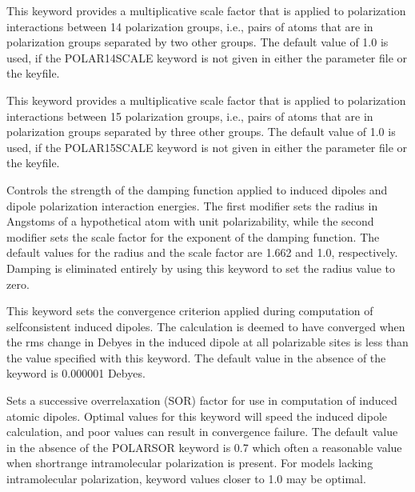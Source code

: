 \documentclass[letterpaper,11pt,english]{sphinxmanual}
\begin{document}
  This keyword provides a multiplicative scale factor that is applied to polarization interactions between 1\sphinxhyphen{}4 polarization groups, i.e., pairs of atoms that are in polarization groups separated by two other groups. The default value of 1.0 is used, if the POLAR\sphinxhyphen{}14\sphinxhyphen{}SCALE keyword is not given in either the parameter file or the keyfile.

  This keyword provides a multiplicative scale factor that is applied to polarization interactions between 1\sphinxhyphen{}5 polarization groups, i.e., pairs of atoms that are in polarization groups separated by three other groups. The default value of 1.0 is used, if the POLAR\sphinxhyphen{}15\sphinxhyphen{}SCALE keyword is not given in either the parameter file or the keyfile.

  Controls the strength of the damping function applied to induced dipoles and dipole polarization interaction energies. The first modifier sets the radius in Angstoms of a hypothetical atom with unit polarizability, while the second modifier sets the scale factor for the exponent of the  damping function. The default values for the radius and the scale factor are 1.662 and 1.0, respectively. Damping is eliminated entirely by using this keyword to set the radius value to zero.

  This keyword sets the convergence criterion applied during computation of self\sphinxhyphen{}consistent induced dipoles. The calculation is deemed to have converged when the rms change in Debyes in the induced dipole at all polarizable sites is less than the value specified with this keyword. The default value in the absence of the keyword is 0.000001 Debyes.

  Sets a successive overrelaxation (SOR) factor for use in computation of induced atomic dipoles. Optimal values for this keyword will speed the induced dipole calculation, and poor values can result in convergence failure. The default value in the absence of the POLAR\sphinxhyphen{}SOR keyword is 0.7 which often a reasonable value when short\sphinxhyphen{}range intramolecular polarization is present. For models lacking intramolecular polarization, keyword values closer to 1.0 may be optimal.
\end{document}
